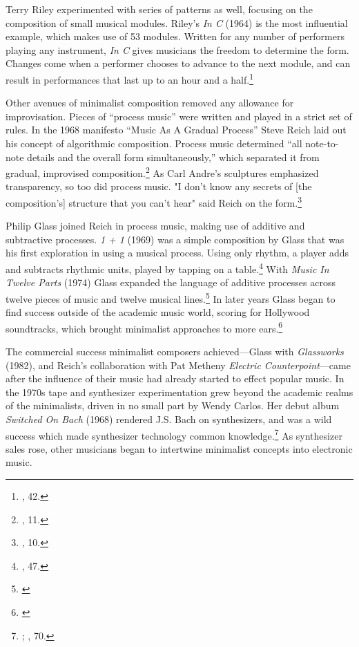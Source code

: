 \documentclass[12pt,twoside]{reedthesis}
\begin{document}
Terry Riley experimented with series of patterns as well, focusing on the composition of small musical modules. Riley's \emph{In C} (1964) is the most influential example, which makes use of 53 modules. Written for any number of performers playing any instrument, \emph{In C} gives musicians the freedom to determine the form. Changes come when a performer chooses to advance to the next module, and can result in performances that last up to an hour and a half.\footnote{\cite{obendorfMinimalismDesigningSimplicity2009}, 42.}

Other avenues of minimalist composition removed any allowance for improvisation. Pieces of ``process music'' were written and played in a strict set of rules. In the 1968 manifesto ``Music As A Gradual Process'' Steve Reich laid out his concept of algorithmic composition. Process music determined ``all note-to-note details and the overall form simultaneously,'' which separated it from gradual, improvised composition.\footnote{\cite{reichWritingsMusic1974}, 11.} As Carl Andre's sculptures emphasized transparency, so too did process music. "I don't know any secrets of [the composition's] structure that you can't hear" said Reich on the form.\footnote{\cite{reichWritingsMusic1974}, 10.}

Philip Glass joined Reich in process music, making use of additive and subtractive processes. \emph{1 + 1} (1969) was a simple composition by Glass that was his first exploration in using a musical process. Using only rhythm, a player adds and subtracts rhythmic units, played by tapping on a table.\footnote{\cite{obendorfMinimalismDesigningSimplicity2009}, 47.} With \emph{Music In Twelve Parts} (1974) Glass expanded the language of additive processes across twelve pieces of music and twelve musical lines.\footnote{\cite{pageTwelvePartsPhilip}} In later years Glass began to find success outside of the academic music world, scoring for Hollywood soundtracks, which brought minimalist approaches to more ears.\footnote{\cite{evanstristanGlassPhilip}}

The commercial success minimalist composers achieved---Glass with \emph{Glassworks} (1982), and Reich's collaboration with Pat Metheny \emph{Electric Counterpoint}---came after the influence of their music had already started to effect popular music. In the 1970s tape and synthesizer experimentation grew beyond the academic realms of the minimalists, driven in no small part by Wendy Carlos. Her debut album \emph{Switched On Bach} (1968) rendered J.S. Bach on synthesizers, and was a wild success which made synthesizer technology common knowledge.\footnote{\cite{wendycarlosSwitchedOnBach1968}; \cite{prendergastAmbientCenturyMahler2000}, 70.} As synthesizer sales rose, other musicians began to intertwine minimalist concepts into electronic music.
\end{document}
